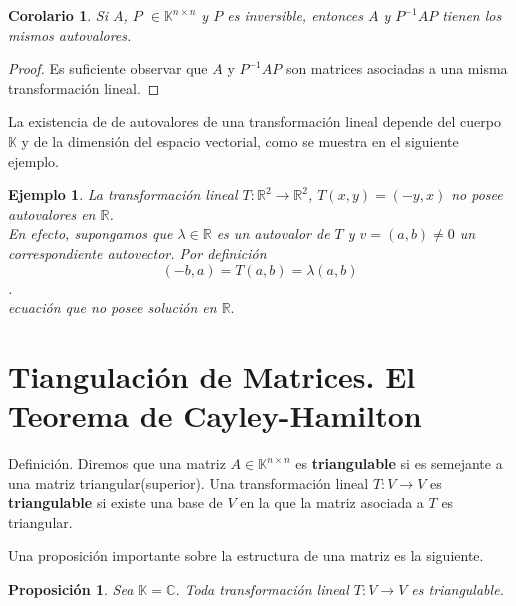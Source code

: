\documentclass[b5paper, 11pt]{book}
\newcommand{\0}{\mathbf{0}}
\theoremstyle{estiloB}
\theoremstyle{estiloC}
\theoremstyle{estiloD}
\newtheorem{proposition}{Proposición}[section]
\newtheorem{corollary}{Corolario}[section]
\newtheorem{example}{Ejemplo}[section]
\begin{document}
\begin{corollary}
	Si $A$, $P$ $\in \mathbb{K}^{n \times n}$ y $P$ es inversible, entonces $A$ y $P^{-1}AP$ tienen  los mismos autovalores.
\end{corollary}

\begin{proof}
	Es suficiente observar que $A$ y $P^{-1}AP$ son matrices asociadas a una misma transformación lineal.
\end{proof}

\noindent La existencia de de autovalores de una transformación lineal depende del cuerpo $\mathbb{K}$ y de la dimensión del espacio vectorial, como se muestra en el siguiente ejemplo.

\begin{example}
	La transformación lineal $T\colon\mathbb{R}^{2} \rightarrow \mathbb{R}^{2}$, $T(x,y)=(-y,x)$ no posee autovalores en $\mathbb{R}$.\\
	
	En efecto, supongamos que $\lambda \in \mathbb{R} $ es un autovalor de $T$ y $v = (a,b) \neq 0$ un correspondiente autovector. Por definición \\
	
	$$(-b,a) = T(a,b) = \lambda(a,b)$$. \\
	ecuación que no posee solución en $\mathbb{R}.$
\end{example}

\section{Tiangulación de Matrices. El Teorema de Cayley-Hamilton}
Definición. Diremos que una matriz $A\in \mathbb{K}^{n \times n}$ es \textbf{triangulable}  si es semejante a una matriz triangular(superior). Una transformación lineal $T\colon V\rightarrow V$ es \textbf{triangulable} si existe una base de $V$ en la que la matriz asociada a $T$ es triangular.

Una proposición importante sobre la estructura de una matriz es la siguiente.
\begin{proposition}
	Sea $\mathbb{K}=\mathbb{C}$. Toda transformación lineal $T\colon V\rightarrow V$ es triangulable.
\end{proposition}
\end{document}
